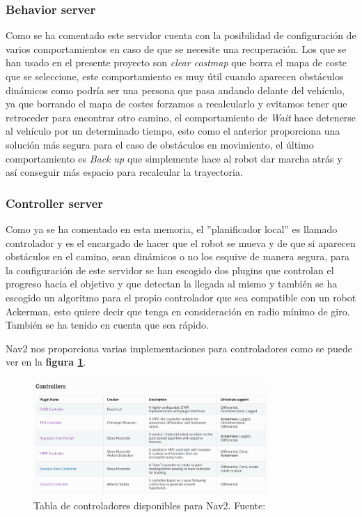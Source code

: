 \subsubsection{Behavior server}
Como se ha comentado este servidor cuenta con la posibilidad de configuración de varios comportamientos en caso de que se necesite una recuperación. 
Los que se han usado en el presente proyecto son \textit{clear costmap} que borra el mapa de coste que se seleccione, este comportamiento es 
muy útil cuando aparecen obstáculos dinámicos como podría ser una persona que pasa andando delante del vehículo, ya que borrando el mapa 
de costes forzamos a recalcularlo y evitamos tener que retroceder para encontrar otro camino, el comportamiento de \textit{Wait} hace detenerse al vehículo 
por un determinado tiempo, esto como el anterior proporciona una solución más segura para el caso de obstáculos en movimiento, el último comportamiento 
es \textit{Back up} que simplemente hace al robot dar marcha atrás y así conseguir más espacio para recalcular la trayectoria.

\subsubsection{Controller server}



Como ya se ha comentado en esta memoria, el ''planificador local'' es llamado controlador y es el encargado de hacer que el robot se mueva 
y de que si aparecen obstáculos en el camino, sean dinámicos o no los esquive de manera segura, para la configuración de este servidor se han escogido dos plugins 
que controlan el progreso hacia el objetivo y que detectan la llegada al mismo y también se ha escogido un algoritmo para el propio controlador 
que sea compatible con un robot Ackerman, esto quiere decir que tenga en consideración en radio mínimo de giro. También se ha tenido en cuenta que sea rápido.

Nav2 nos proporciona varias implementaciones para controladores como se puede ver en la \textbf{figura \ref{fig:controllers_tabla}}. 
\begin{figure}[H]
    \centering
    \includegraphics[width=0.8\textwidth]{images/Controllers_tabla.png}
    \caption{Tabla de controladores disponibles para Nav2. Fuente: \cite{nav2}}
    \label{fig:controllers_tabla}
\end{figure}

